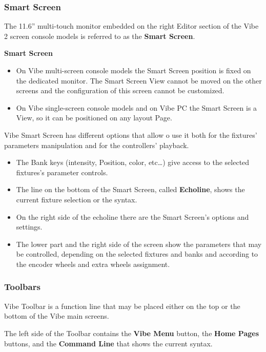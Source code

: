 \documentclass[
]{article}
\begin{document}
\hypertarget{smart-screen}{%
\subsubsection{Smart Screen}\label{smart-screen}}

The 11.6'' multi-touch monitor embedded on the right Editor section of the Vibe 2 screen console models is referred to as the \textbf{Smart Screen}.

\textbf{Smart Screen}

\begin{itemize}
\item
  On Vibe multi-screen console models the Smart Screen position is fixed on the dedicated monitor. The Smart Screen View cannot be moved on the other screens and the configuration of this screen cannot be customized.
\item
  On Vibe single-screen console models and on Vibe PC the Smart Screen is a View, so it can be positioned on any layout Page.
\end{itemize}

Vibe Smart Screen has different options that allow o use it both for the fixtures' parameters manipulation and for the controllers' playback.

\begin{itemize}
\item
  The Bank keys (intensity, Position, color, etc\ldots) give access to the selected fixtures's parameter controls.
\item
  The line on the bottom of the Smart Screen, called \textbf{Echoline}, shows the current fixture selection or the syntax.
\item
  On the right side of the echoline there are the Smart Screen's options and settings.
\item
  The lower part and the right side of the screen show the parameters that may be controlled, depending on the selected fixtures and banks and according to the encoder wheels and extra wheels assignment.
\end{itemize}

\hypertarget{toolbars}{%
\subsubsection{Toolbars}\label{toolbars}}

Vibe Toolbar is a function line that may be placed either on the top or the bottom of the Vibe main screens.

The left side of the Toolbar contains the \textbf{Vibe Menu} button, the \textbf{Home Pages} buttons, and the \textbf{Command Line} that shows the current syntax.
\end{document}
